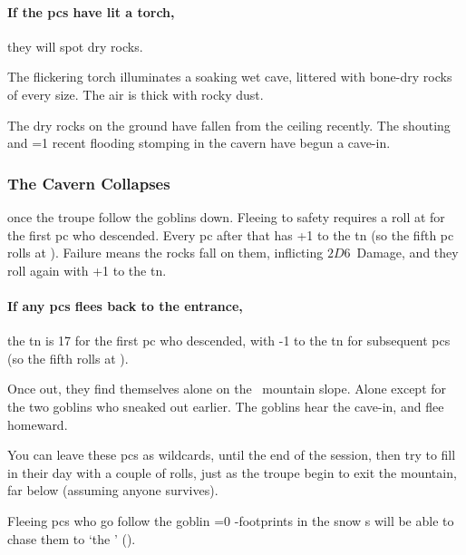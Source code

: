 \begin{multicols}{2}
\paragraph{If the \glspl{pc} have lit a torch,}
they will spot dry rocks.

\begin{boxtext}
  The flickering torch illuminates a soaking wet cave, littered with bone-dry rocks of every size.
  The air is thick with rocky dust.
\end{boxtext}

The dry rocks on the ground have fallen from the ceiling recently.
The shouting and \ifnum\value{temperature}=1 recent flooding \else stomping \fi in the cavern have begun a cave-in.


\subsubsection{The Cavern Collapses}
once the troupe follow the goblins down.
Fleeing to safety requires a  roll at \tn[3] for the first \gls{pc} who descended.
Every \gls{pc} after that has +1 to the \gls{tn} (so the fifth \gls{pc} rolls at \tn[7]).
Failure means the rocks fall on them, inflicting $2D6$~Damage, and they roll again with +1 to the \gls{tn}.

\paragraph{If any \glspl{pc} flees back to the entrance,}
the \gls{tn} is 17 for the first \gls{pc} who descended, with -1 to the \gls{tn} for subsequent \glspl{pc} (so the fifth rolls at \tn[13]).

Once out, they find themselves alone on the \showTemperature\ mountain slope.
Alone except for the two goblins who sneaked out earlier.
The goblins hear the cave-in, and flee homeward.

\label{pcRunaways}
You can leave these \glspl{pc} as wildcards, until the end of the session, then try to fill in their day with a couple of rolls, just as the troupe begin to exit the mountain, far below (assuming anyone survives).

Fleeing \glspl{pc} who go follow the goblin%
\ifnum\value{temperature}=0%
 -footprints in the snow
\else%
  s
\fi%
will be able to chase them to `the ' ().


\end{multicols}
